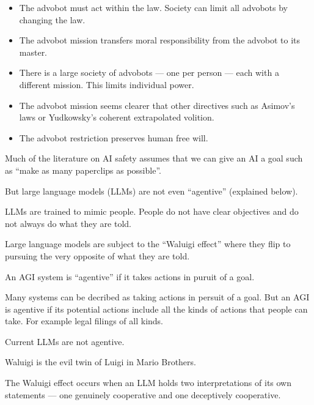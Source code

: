 {\begin{itemize}
\item The advobot must act within the law. Society can limit all advobots by changing the law.

\vfill
\item The advobot mission transfers moral responsibility from the advobot to its master.

\vfill
\item There is a large society of advobots --- one per person --- each with a different mission.  This limits individual power.

\vfill
\item The advobot mission seems clearer that other directives such as Asimov’s laws or Yudkowsky's coherent extrapolated volition.

\vfill
\item The advobot restriction preserves human free will.
\end{itemize}



Much of the literature on AI safety assumes that we can give an AI a goal such as ``make as many paperclips as possible''.

\vfill
But large language models (LLMs) are not even ``agentive'' (explained below).

\vfill
LLMs are trained to mimic people.  People do not have clear objectives and do not always do what they are told.

\vfill
Large language models are subject to the ``Waluigi effect'' where they flip to pursuing the very opposite of what they are told.


An AGI system is ``agentive'' if it takes actions in puruit of a goal.

\vfill
Many systems can be decribed as taking actions in persuit of a goal.  But an AGI is agentive if its potential actions include
all the kinds of actions that people can take.  For example legal filings of all kinds.

\vfill
Current LLMs are not agentive.


Waluigi is the evil twin of Luigi in Mario Brothers.

\vfill
The Waluigi effect occurs when an LLM holds two
interpretations of its own statements --- one genuinely cooperative
and one deceptively cooperative.

}
